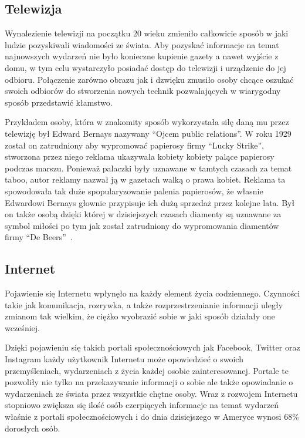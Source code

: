 \subsection{Telewizja}
Wynalezienie telewizji na początku 20 wieku zmieniło całkowicie sposób w jaki ludzie pozyskiwali wiadomości ze świata.
Aby pozyskać informacje na temat najnowszych wydarzeń nie było konieczne kupienie gazety a nawet 
wyjście z domu, w tym celu wystarczyło posiadać dostęp do telewizji i urządzenie do jej odbioru. Połączenie zarówno obrazu
jak i dzwięku zmusiło osoby chcące oszukać swoich odbiorów do stworzenia nowych technik 
pozwalających w wiarygodny sposób przedstawić kłamstwo.

Przykładem osoby, która w znakomity sposób wykorzystała siłę daną mu przez telewizję był Edward Bernays
nazywany ``Ojcem public relations''.
W roku 1929 został on zatrudniony aby wypromować papierosy firmy ``Lucky Strike'',
stworzona przez niego reklama ukazywała kobiety kobiety palące papierosy podczas marszu. 
Ponieważ palaczki były uznawane w tamtych czasach za temat
taboo, autor reklamy nazwał ją w gazetach walką o prawa kobiet. Reklama ta spowodowała tak duże 
spopularyzowanie palenia papierosów, że własnie Edwardowi Bernays głownie przypisuje
ich dużą sprzedaż przez kolejne lata.
Był on także osobą dzięki której w dzisiejszych czasach diamenty są uznawane za symbol miłości po tym jak
został zatrudniony do wypromowania diamentów firmy ``De Beers''~\cite{MarkDice}.

\subsection{Internet}
Pojawienie się Internetu wpłynęło na każdy element życia codziennego. Czynności takie jak komunikacja, rozrywka,
a także rozprzestrzenianie informacji uległy zmianom tak wielkim, że ciężko wyobrazić sobie w jaki sposób działały
one wcześniej. 

Dzięki pojawieniu się takich portali społecznościowych jak Facebook, Twitter oraz Instagram każdy użytkownik
Internetu może opowiedzieć o swoich przemyśleniach, wydarzeniach z życia każdej osobie zainteresowanej. Portale te
pozwoliły nie tylko na przekazywanie informacji o sobie ale także opowiadanie o wydarzeniach ze świata przez wszystkie
chętne osoby. Wraz z rozwojem Internetu stopniowo zwiększa się ilość osób czerpiących informacje na temat wydarzeń
właśnie z portali społecznościowych i do dnia dzisiejszego w Ameryce wynosi 68\% dorosłych osób. 

